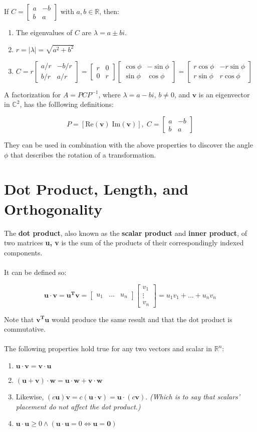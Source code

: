 \documentclass[12pt]{article}
\newcommand{\R}{\mathbb{R}}
\newcommand{\bt}[1]{\textbf{{#1}}}
\newcommand{\bm}[1]{\mathbf{{#1}}}
\newcommand{\mb}{\begin{bmatrix}}
\newcommand{\me}{\end{bmatrix}}
\newcommand{\mmb}[1]{\mathbb{{#1}}}
\begin{document}
If $C = \mb a & -b \\ b & a \me$ with $a, b \in \R$, then:

\begin{enumerate}
    \item The eigenvalues of $C$ are $\lambda = a \pm bi$.
    \item $r = |\lambda| = \sqrt{a^2 + b^2}$
    \item $C = r \mb a/r & -b/r \\ b/r & a/r \me = \mb r & 0 \\ 0 & r \me \mb \cos\phi & -\sin\phi \\ \sin\phi & \cos\phi \me = \mb r\cos\phi & -r\sin\phi \\ r\sin\phi & r\cos\phi \me$
\end{enumerate}


A factorization for $A = PCP^{-1}$, where $\lambda = a - bi$, $b \neq 0$, and $\bm{v}$ is an eigenvector in $\mmb{C}^2$, has the folllowing definitions:

$$P = [\textrm{Re}(\bm{v})\; \textrm{Im}(\bm{v})],\; C = \mb a & -b \\ b & a\me$$

They can be used in combination with the above properties to discover the angle $\phi$ that describes the rotation of a transformation.

\section*{Dot Product, Length, and Orthogonality}

The \bt{dot product}, also known as the \bt{scalar product} and
\bt{inner product}, of two matrices \bt{u, v} is the sum of the products
of their correspondingly indexed components. \\ \\

It can be defined so:

$$\bm{u \cdot v} = \bm{u^T v} = \mb u_1 & \dots & u_n \me \mb v_1 \\ \vdots \\ v_n \me = u_1v_1 + ... + u_nv_n$$

Note that $\bm{v^T u}$ would produce the same result and that the dot product is commutative. \\ \\

The following properties hold true for any two vectors and scalar in $\R^n$:

\begin{enumerate}
    \item $\bm{u \cdot v} = \bm{v \cdot u}$
    \item $\bm{(u + v)\cdot w = u\cdot w + v\cdot w}$
    \item Likewise, $(c\bm{u})\bm{v} = c\bm{(u\cdot v) = \bm{u}}\cdot (c\bm{v})$. \emph{(Which is to say that scalars' placement do not affect the dot product.)}
    \item $\bm{u \cdot u} \geq 0 \land (\bm{u \cdot u} = 0 \iff \bm{u = 0})$
\end{enumerate}
\end{document}
